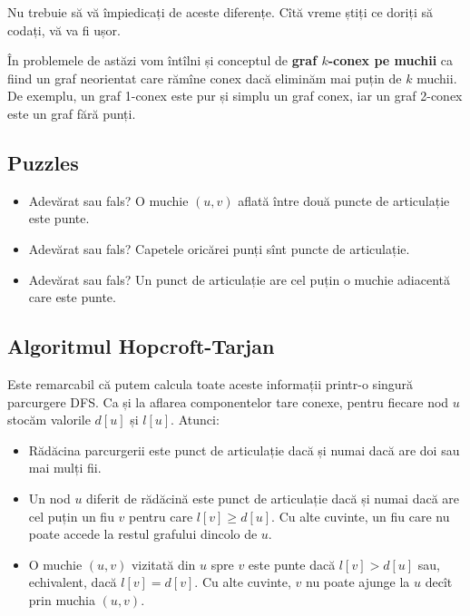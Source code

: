 \documentclass[../main.tex]{subfiles}
\begin{document}
Nu trebuie să vă împiedicați de aceste diferențe. Cîtă vreme știți ce doriți să codați, vă va fi ușor.

În problemele de astăzi vom întîlni și conceptul de \textbf{graf $k$-conex pe muchii} ca fiind un graf neorientat care rămîne conex dacă eliminăm mai puțin de $k$ muchii. De exemplu, un graf 1-conex este pur și simplu un graf conex, iar un graf 2-conex este un graf fără punți.

\subsection{Puzzles}

\begin{itemize}
  \item Adevărat sau fals? O muchie $(u, v)$ aflată între două puncte de articulație este punte.

  \item Adevărat sau fals? Capetele oricărei punți sînt puncte de articulație.

  \item Adevărat sau fals? Un punct de articulație are cel puțin o muchie adiacentă care este punte.
\end{itemize}

\subsection{Algoritmul Hopcroft-Tarjan}

Este remarcabil că putem calcula toate aceste informații printr-o singură parcurgere DFS. Ca și la aflarea componentelor tare conexe, pentru fiecare nod $u$ stocăm valorile $d[u]$ și $l[u]$. Atunci:

\begin{itemize}
  \item Rădăcina parcurgerii este punct de articulație dacă și numai dacă are doi sau mai mulți fii.

  \item Un nod $u$ diferit de rădăcină este punct de articulație dacă și numai dacă are cel puțin un fiu $v$ pentru care $l[v] \ge d[u]$. Cu alte cuvinte, un fiu care nu poate accede la restul grafului dincolo de $u$.

  \item O muchie $(u, v)$ vizitată din $u$ spre $v$ este punte dacă $l[v] > d[u]$ sau, echivalent, dacă $l[v] = d[v]$. Cu alte cuvinte, $v$ nu poate ajunge la $u$ decît prin muchia $(u, v)$.
\end{itemize}
\end{document}
